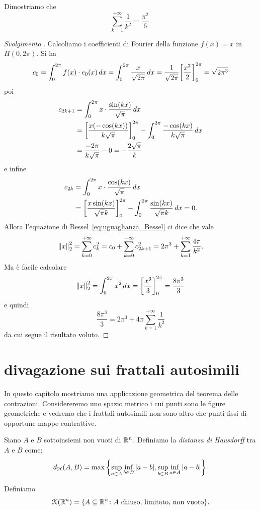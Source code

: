 \begin{exercise}
\label{ex:Basilea}%
Dimostriamo che
\begin{equation}\label{eq:basilea}
  \sum_{k=1}^{+\infty} \frac{1}{k^2} = \frac{\pi^2}{6}.
\end{equation}
\end{exercise}
\begin{proof}[Svolgimento.]
Calcoliamo i coefficienti di Fourier della funzione $f(x)=x$ in $H(0,2\pi)$.
Si ha
\[
 c_0 = \int_0^{2\pi} f(x)\cdot e_0(x)\, dx = \int_0^{2\pi} \frac{x}{\sqrt{2\pi}}\, dx = \frac{1}{\sqrt{2\pi}}{\left[ \frac{x^2}{2} \right]}_0^{2\pi}
  = \sqrt{2\pi^3}
\]
poi
\begin{align*}
  c_{2k+1} &= \int_0^{2\pi} x \cdot \frac{\sin(kx)}{\sqrt \pi}\, dx \\
   &= {\left[ \frac{x(-\cos(kx))}{k\sqrt \pi} \right]}_0^{2\pi}
   - \int_0^{2\pi} \frac{-\cos(kx)}{k\sqrt \pi}\, dx\\
   &= \frac{-2\pi}{k\sqrt \pi} - 0 = -\frac{2\sqrt \pi}{k}
\end{align*}
e infine
\begin{align*}
  c_{2k} &= \int_0^{2\pi} x \cdot \frac{\cos (kx)}{\sqrt \pi}\, dx \\
  &= {\left[ \frac{x \sin(kx)}{\sqrt \pi k} \right]}_0^{2\pi}
  - \int_0^{2\pi} \frac{\sin(kx)}{\sqrt \pi k}\, dx
  = 0.
\end{align*}
Allora l'equazione di Bessel~\eqref{eq:uguaglianza_Bessel} ci dice
che vale
\[
  {\left\Vert x\right\Vert}_2^2 = \sum_{k=0}^{+\infty} c_k^2
  = c_0 + \sum_{k=0}^{+\infty} c_{2k+1}^2
  = 2\pi^3 + \sum_{k=1}^{+\infty} \frac{4\pi}{k^2}.
\]
Ma è facile calcolare
\[
 {\left\Vert x\right\Vert}_2^2 = \int_0^{2\pi} x^2\, dx = {\left[ \frac{x^3}{3} \right]}_0^{2\pi}
  = \frac{8\pi^3}{3}
\]
e quindi
\[
  \frac{8\pi^3}{3} = 2\pi^3 + 4\pi \sum_{k=1}^{+\infty}\frac{1}{k^2}
\]
da cui segue il risultato voluto.
\end{proof}

\section{divagazione sui frattali autosimili}

In questo capitolo mostriamo una applicazione geometrica del teorema delle contrazioni.
Considereremo uno spazio metrico i cui punti sono le figure geometriche
e vedremo che i frattali autosimili non sono altro che punti fissi
di opportune mappe contrattive.

\begin{definition}
Siano $A$ e $B$ sottoinsiemi non vuoti di ${\mathbb R}^n$.
Definiamo la \emph{distanza di Hausdorff}
tra $A$ e $B$ come:
\[
  d_{\mathcal H}(A,B) = \max{\left\{ \sup_{a\in A}\inf_{b\in B} {\left|a-b\right|}, \sup_{b\in B} \inf_{a\in A} {\left|a-b\right|} \right\}}.
\]

Definiamo
\[
 \mathcal K({\mathbb R}^n) = {\left\{ A \subseteq {\mathbb R}^n \colon \text{$A$ chiuso, limitato, non vuoto} \right\}}.
\]
\end{definition}

